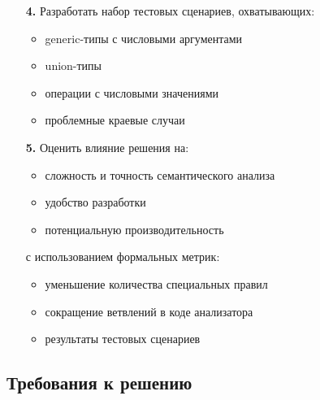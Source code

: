 \begin{enumerate}[leftmargin=*,align=left]
    \item[\textbf{4.}] Разработать набор тестовых сценариев, охватывающих:
    \begin{itemize}[label={--}]
        \item generic-типы с числовыми аргументами
        \item union-типы
        \item операции с числовыми значениями
        \item проблемные краевые случаи
    \end{itemize}

    \item[\textbf{5.}] Оценить влияние решения на:
    \begin{itemize}[label={--}]
        \item сложность и точность семантического анализа
        \item удобство разработки
        \item потенциальную производительность
    \end{itemize}
    с использованием формальных метрик:
    \begin{itemize}[label={--}]
        \item уменьшение количества специальных правил
        \item сокращение ветвлений в коде анализатора
        \item результаты тестовых сценариев
    \end{itemize}
\end{enumerate}

\subsection{Требования к решению}
